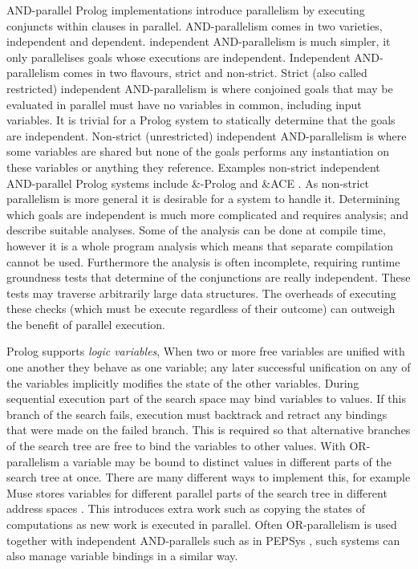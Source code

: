 AND-parallel Prolog implementations introduce parallelism by executing
conjuncts within clauses in parallel.
AND-parallelism comes in two varieties, independent and dependent.
independent AND-parallelism is much simpler, it only parallelises goals
whose executions are independent.
Independent AND-parallelism comes in two flavours, strict and non-strict.
Strict (also called restricted) independent AND-parallelism is where
conjoined goals that may be evaluated in parallel must have no variables in
common, including input variables.
It is trivial for a Prolog system to statically determine that the goals are
independent.
Non-strict (unrestricted) independent AND-parallelism is where some variables
are shared but none of the goals performs any instantiation on these variables
or anything they reference.
Examples non-strict independent AND-parallel Prolog systems include \&-Prolog
\citep*{Hermenegildo:1991:and-parallel,
DBLP:journals/jlp/MuthukumarBBH99}
and \&ACE \citep{gupta:1991:ace}.
As non-strict parallelism is more general it is desirable for a system to
handle it.
Determining which goals are independent is much more complicated and
requires analysis;
\citet*{DBLP:journals/tcs/GrasH09} and \citet*{Hermenegildo1995} describe
suitable analyses.
Some of the analysis can be done at compile time,
however it is a whole program analysis which means that separate compilation
cannot be used.
Furthermore the analysis is often incomplete,
requiring runtime groundness tests that determine of the conjunctions are
really independent.
These tests may traverse arbitrarily large data structures.
The overheads of executing these checks
(which must be execute regardless of their outcome)
can outweigh the benefit of parallel execution.

Prolog supports \emph{logic variables},
When two or more free variables are unified with one another they behave as one
variable;
any later successful unification on any of the variables implicitly modifies
the state of the other variables.
During sequential execution
part of the search space may bind variables to values.
If this branch of the search fails,
execution must backtrack and retract any bindings that were made on the
failed branch.
This is required so that alternative
branches of the search tree are free to bind the variables to other values.
With OR-parallelism a variable may be bound to distinct values in different
parts of the search tree at once.
There are many different ways to implement this,
for example Muse stores variables for different parallel parts of the search
tree in different address spaces \citep{ali:1990:muse}.
This introduces extra work such as copying the states of computations as new
work is executed in parallel.
Often OR-parallelism is used together with independent AND-parallels
such as in PEPSys \citep*{baron:1988:pepsys},
such systems can also manage variable bindings in a similar way.

